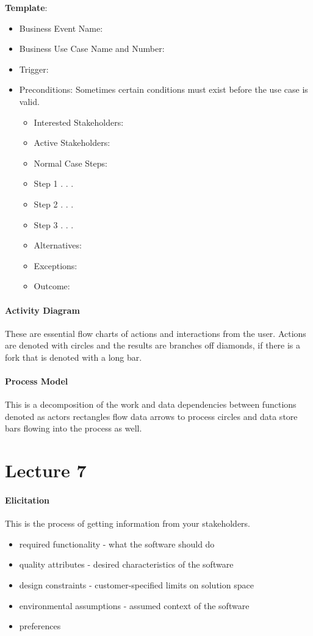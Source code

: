 \documentclass[12pt]{article}
\begin{document}
\textbf{Template}:
\begin{itemize}
\item Business Event Name:
\item Business Use Case Name and Number:
\item Trigger:
\item Preconditions: Sometimes certain conditions must exist before the use case is valid.
	\begin{itemize}
	\item Interested Stakeholders:
	\item Active Stakeholders:
	\item Normal Case Steps:
	\item Step 1 . . .
	\item Step 2 . . .
	\item Step 3 . . .
	\item Alternatives:
	\item Exceptions:
	\item Outcome:
	\end{itemize}
\end{itemize}

\paragraph{Activity Diagram} 
\label{par:activity_diagram}
These are essential flow charts of actions and interactions from the user. Actions are denoted with circles and the results are branches off diamonds, if there is a fork that is denoted with a long bar. 

\paragraph{Process Model} 
\label{par:process_model}
This is a decomposition of the work and data dependencies between functions denoted as actors rectangles flow data arrows to process circles and data store bars flowing into the process as well. 


\section*{Lecture 7}
\label{sec:lecture_7}
\paragraph{Elicitation} 
\label{par:elicitation}
This is the process of getting information from your stakeholders. 
\begin{itemize}
	\item required functionality - what the software should do
	\item quality attributes - desired characteristics of the software
	\item design constraints - customer-specified limits on solution space
	\item environmental assumptions - assumed context of the software
	\item preferences
\end{itemize}
\end{document}
